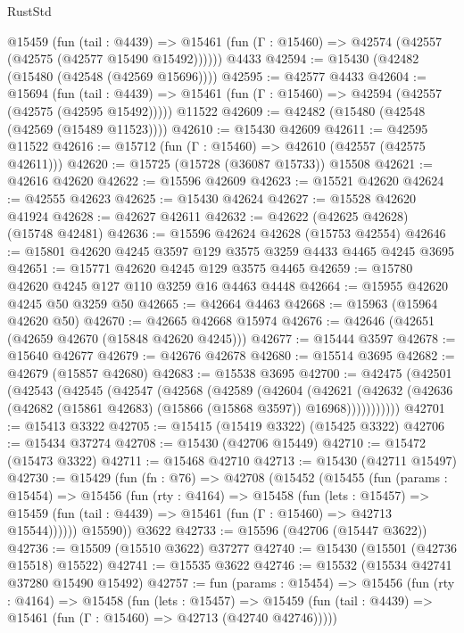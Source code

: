 \begin{lexlean}{RustStd}
\begin{coremodule}
    @15459
      (fun (tail : @4439) =>
      @15461 (fun (Γ : @15460) => @42574 (@42557 (@42575 (@42577 @15490 @15492))))))
    @4433
@42594 := @15430 (@42482 (@15480 (@42548 (@42569 @15696))))
@42595 := @42577 @4433
@42604 := @15694
    (fun (tail : @4439) => @15461 (fun (Γ : @15460) => @42594 (@42557 (@42575 (@42595 @15492)))))
    @11522
@42609 := @42482 (@15480 (@42548 (@42569 (@15489 @11523))))
@42610 := @15430 @42609
@42611 := @42595 @11522
@42616 := @15712 (fun (Γ : @15460) => @42610 (@42557 (@42575 @42611)))
@42620 := @15725 (@15728 (@36087 @15733)) @15508
@42621 := @42616 @42620
@42622 := @15596 @42609
@42623 := @15521 @42620
@42624 := @42555 @42623
@42625 := @15430 @42624
@42627 := @15528 @42620 @41924
@42628 := @42627 @42611
@42632 := @42622 (@42625 @42628) (@15748 @42481)
@42636 := @15596 @42624 @42628 (@15753 @42554)
@42646 := @15801 @42620 @4245 @3597 @129 @3575 @3259 @4433 @4465 @4245 @3695
@42651 := @15771 @42620 @4245 @129 @3575 @4465
@42659 := @15780 @42620 @4245 @127 @110 @3259 @16 @4463 @4448
@42664 := @15955 @42620 @4245 @50 @3259 @50
@42665 := @42664 @4463
@42668 := @15963 (@15964 @42620 @50)
@42670 := @42665 @42668 @15974
@42676 := @42646 (@42651 (@42659 @42670 (@15848 @42620 @4245)))
@42677 := @15444 @3597
@42678 := @15640 @42677
@42679 := @42676 @42678
@42680 := @15514 @3695
@42682 := @42679 (@15857 @42680)
@42683 := @15538 @3695
@42700 := @42475
    (@42501
      (@42543
        (@42545
          (@42547
            (@42568
              (@42589
                (@42604
                  (@42621
                    (@42632
                      (@42636 (@42682 (@15861 @42683) (@15866 (@15868 @3597)) @16968)))))))))))
@42701 := @15413 @3322
@42705 := @15415 (@15419 @3322) (@15425 @3322)
@42706 := @15434 @37274
@42708 := @15430 (@42706 @15449)
@42710 := @15472 (@15473 @3322)
@42711 := @15468 @42710
@42713 := @15430 (@42711 @15497)
@42730 := @15429
    (fun (fn : @76) =>
    @42708
      (@15452
        (@15455
          (fun (params : @15454) =>
          @15456
            (fun (rty : @4164) =>
            @15458
              (fun (lets : @15457) =>
              @15459 (fun (tail : @4439) => @15461 (fun (Γ : @15460) => @42713 @15544))))))
        @15590))
    @3622
@42733 := @15596 (@42706 (@15447 @3622))
@42736 := @15509 (@15510 @3622) @37277
@42740 := @15430 (@15501 (@42736 @15518) @15522)
@42741 := @15535 @3622
@42746 := @15532 (@15534 @42741 @37280 @15490 @15492)
@42757 := fun (params : @15454) =>
  @15456
    (fun (rty : @4164) =>
    @15458
      (fun (lets : @15457) =>
      @15459 (fun (tail : @4439) => @15461 (fun (Γ : @15460) => @42713 (@42740 @42746)))))

\end{coremodule}
\end{lexlean}
